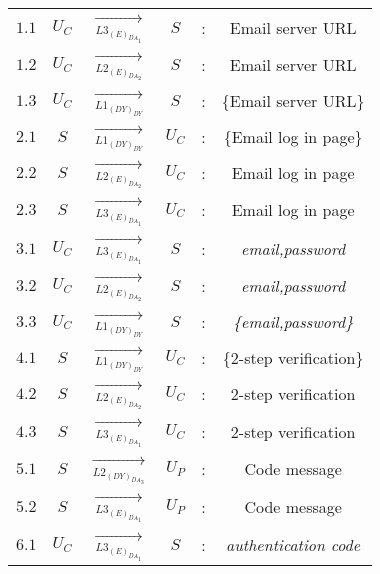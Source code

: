 \begin{center} 
\begin{tabular}{ p{.25cm} c c c c c } 

$1.1$ & $U_C$ & $\xrightarrow[L3_{{(E)}_{{DA}_1}}]{}$ & $S$ & : & Email server URL \\ 

$1.2$ & $U_C$ & $\xrightarrow[L2_{{(E)}_{{DA}_2}}]{}$ & $S$ & : & Email server URL \\ 

$1.3$ & $U_C$ & $\xrightarrow[L1_{(DY)_{DY}}]{}$ & $S$ & : & \{Email server URL\} \\ 


$2.1$ & $S$ & $\xrightarrow[L1_{(DY)_{DY}}]{}$ & $U_C$ & : & \{Email log in page\} \\ 

$2.2$ & $S$ & $\xrightarrow[L2_{{(E)}_{{DA}_2}}]{}$ & $U_C$ & : & Email log in page \\ 

$2.3$ & $S$ & $\xrightarrow[L3_{{(E)}_{{DA}_1}}]{}$ & $U_C$ & : & Email log in page \\ 


$3.1$ & $U_C$ & $\xrightarrow[L3_{{(E)}_{{DA}_1}}]{}$ & $S$ & : & \textit{email,password} \\ 

$3.2$ & $U_C$ & $\xrightarrow[L2_{{(E)}_{{DA}_2}}]{}$ & $S$ & : & \textit{email,password} \\ 

$3.3$ & $U_C$ & $\xrightarrow[L1_{(DY)_{DY}}]{}$ & $S$ & : & \textit{\{email,password\}} \\ 


$4.1$ & $S$ & $\xrightarrow[L1_{(DY)_{DY}}]{}$ & $U_C$ & : & \{2-step verification\} \\ 

$4.2$ & $S$ & $\xrightarrow[L2_{{(E)}_{{DA}_2}}]{}$ & $U_C$ & : & 2-step verification \\ 

$4.3$ & $S$ & $\xrightarrow[L3_{{(E)}_{{DA}_1}}]{}$ & $U_C$ & : & 2-step verification\\ 


$5.1$ & $S$ & $\xrightarrow[L2_{{(DY)}_{{DA}_3}}]{}$ & $U_P$ & : & Code message \\ 

$5.2$ & $S$ & $\xrightarrow[L3_{{(E)}_{{DA}_1}}]{}$ & $U_P$ & : & Code message \\ 


$6.1$ & $U_C$ & $\xrightarrow[L3_{{(E)}_{{DA}_1}}]{}$ & $S$ & : & \textit{authentication code} \\ 


\end{tabular}
\end{center}
